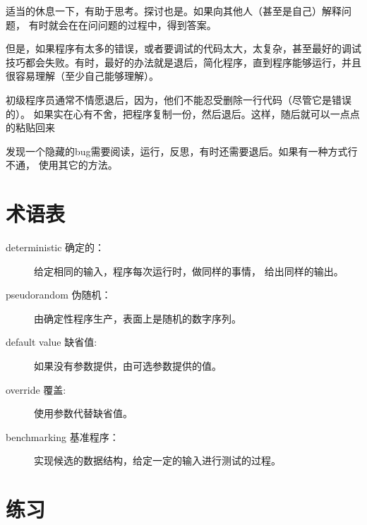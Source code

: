 适当的休息一下，有助于思考。探讨也是。如果向其他人（甚至是自己）解释问题，
有时就会在在问问题的过程中，得到答案。

但是，如果程序有太多的错误，或者要调试的代码太大，太复杂，甚至最好的调试
技巧都会失败。有时，最好的办法就是退后，简化程序，直到程序能够运行，并且
很容易理解（至少自己能够理解）。

初级程序员通常不情愿退后，因为，他们不能忍受删除一行代码（尽管它是错误的）。
如果实在心有不舍，把程序复制一份，然后退后。这样，随后就可以一点点的粘贴回来


发现一个隐藏的bug需要阅读，运行，反思，有时还需要退后。如果有一种方式行不通，
使用其它的方法。

\section{术语表}

\begin{description}

\item [deterministic 确定的：]给定相同的输入，程序每次运行时，做同样的事情，
给出同样的输出。

\item [pseudorandom 伪随机：]由确定性程序生产，表面上是随机的数字序列。

\item [default value 缺省值:]如果没有参数提供，由可选参数提供的值。

\item [override 覆盖:]使用参数代替缺省值。

\item [benchmarking
基准程序：]实现候选的数据结构，给定一定的输入进行测试的过程。


\end{description}


\section{练习}

